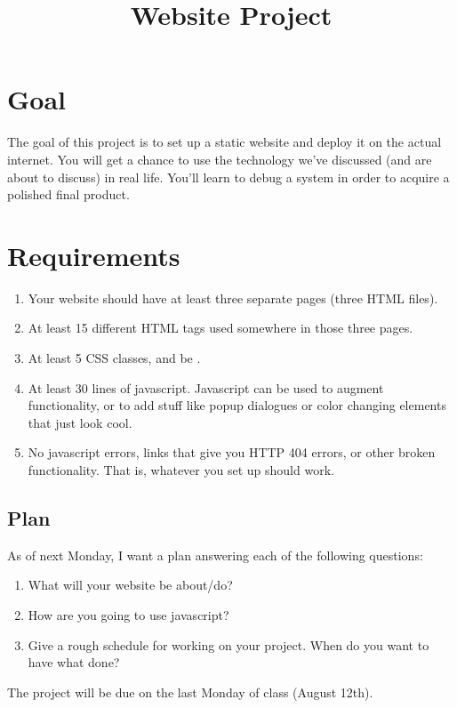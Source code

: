\documentclass{article}
\title{Website Project}
\begin{document}
\maketitle

\section{Goal}
The goal of this project is to set up a static website and deploy it on the actual internet.  You will get a chance to use the technology we've discussed (and are about to discuss) in real life.  You'll learn to debug a system in order to acquire a polished final product.

\section{Requirements}
\begin{enumerate}
\item Your website should have at least three separate pages (three HTML files).
\item At least 15 different HTML tags used somewhere in those three pages.
\item At least 5 CSS classes, and be .
\item At least 30 lines of javascript.  Javascript can be used to augment functionality, or to add stuff like popup dialogues or color changing elements that just look cool.
\item No javascript errors, links that give you HTTP 404 errors, or other broken functionality.  That is, whatever you set up should work.
\end{enumerate}


\subsection{Plan}
As of next Monday, I want a plan answering each of the following questions:

\begin{enumerate}
\item What will your website be about/do?
\item How are you going to use javascript?
\item Give a rough schedule for working on your project.  When do you want to have what done?
\end{enumerate}

The project will be due on the last Monday of class (August 12th).
\end{document}

